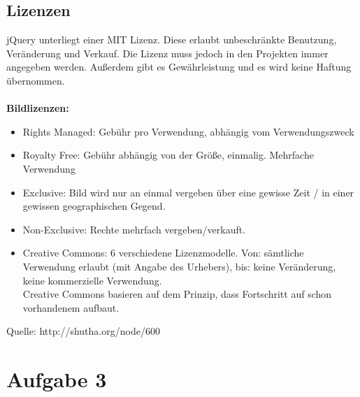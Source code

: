\documentclass[12pt, a4paper]{report}
\begin{document}
\subsection*{Lizenzen}
jQuery unterliegt einer MIT Lizenz. Diese erlaubt unbeschränkte Benutzung, Veränderung und Verkauf. Die Lizenz muss jedoch in den Projekten immer angegeben werden. Außerdem gibt es Gewährleistung und es wird keine Haftung übernommen.\\
\\
\textbf{Bildlizenzen:}
\begin{itemize}
	\item Rights Managed: Gebühr pro Verwendung, abhängig vom Verwendungszweck
	\item Royalty Free: Gebühr abhängig von der Größe, einmalig. Mehrfache Verwendung
	\item Exclusive: Bild wird nur an einmal vergeben über eine gewisse Zeit / in einer gewissen geographischen Gegend.
	\item Non-Exclusive: Rechte mehrfach vergeben/verkauft.
	\item Creative Commons: 6 verschiedene Lizenzmodelle. Von: sämtliche Verwendung erlaubt (mit Angabe des Urhebers), bis: keine Veränderung, keine kommerzielle Verwendung.\\
	Creative Commons basieren auf dem Prinzip, dass Fortschritt auf schon vorhandenem aufbaut.
\end{itemize}
Quelle: http://shutha.org/node/600

\section*{Aufgabe 3}
\end{document}
